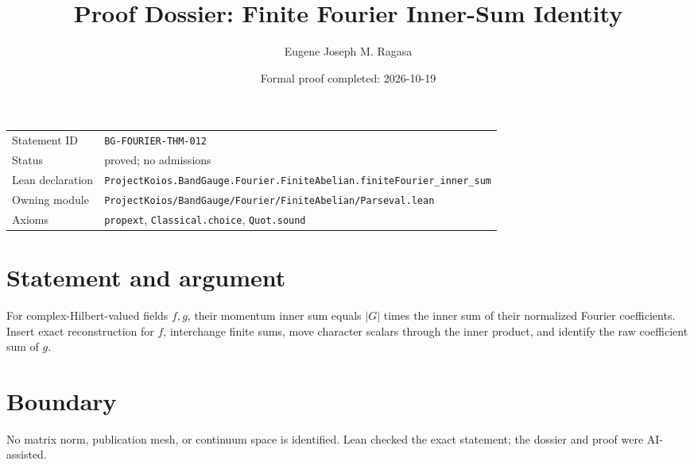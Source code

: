 \documentclass[11pt]{article}
\title{Proof Dossier: Finite Fourier Inner-Sum Identity}
\author{Eugene Joseph M. Ragasa}
\date{Formal proof completed: 2026-10-19}
\begin{document}
\maketitle
\noindent\begin{tabularx}{\textwidth}{@{}lX@{}}\toprule
Statement ID & \texttt{BG-FOURIER-THM-012} \\
Status & proved; no admissions \\
Lean declaration & \texttt{ProjectKoios.BandGauge.Fourier.FiniteAbelian.}\newline\texttt{finiteFourier\_inner\_sum} \\
Owning module & \texttt{ProjectKoios/BandGauge/Fourier/FiniteAbelian/Parseval.lean} \\
Axioms & \texttt{propext}, \texttt{Classical.choice}, \texttt{Quot.sound} \\
\bottomrule\end{tabularx}
\section{Statement and argument}
For complex-Hilbert-valued fields $f,g$, their momentum inner sum equals $|G|$ times the inner sum of their normalized Fourier coefficients. Insert exact reconstruction for $f$, interchange finite sums, move character scalars through the inner product, and identify the raw coefficient sum of $g$.
\section{Boundary}
No matrix norm, publication mesh, or continuum space is identified. Lean checked the exact statement; the dossier and proof were AI-assisted.
\end{document}

